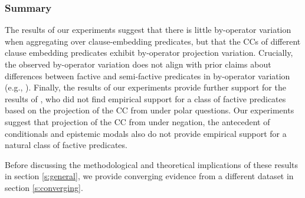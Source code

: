 \documentclass[a4paper,12pt,twoside]{article}
\begin{document}
    


			


   
		\subsubsection{Summary}

  The results of our experiments suggest that there is little by-operator variation when aggregating over clause-embedding predicates, but that the CCs of different clause embedding predicates exhibit by-operator projection variation. 
    Crucially, the observed by-operator variation does not align with prior claims about differences between factive and semi-factive predicates in by-operator variation (e.g., \citealt{karttunen_observations_1971}). Finally, the results of our experiments provide further support for the results of \citealt{degen_are_2022}, who did not find empirical support for a class of factive predicates based on the projection of the CC from under polar questions. Our experiments suggest that projection of the CC from under negation, the antecedent of conditionals and epistemic modals also do not provide empirical support for a natural class of factive predicates.

    Before discussing the methodological and theoretical implications of these results in section \ref{s:general}, we provide converging evidence from a different dataset in section \ref{s:converging}.
   
   
\end{document}
